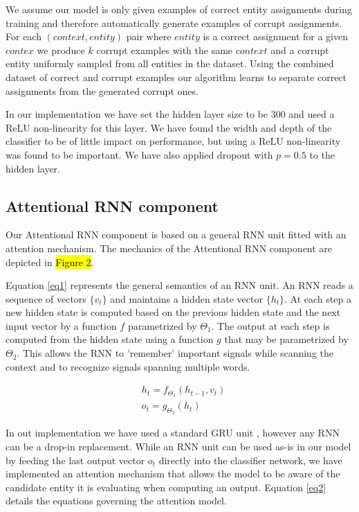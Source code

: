 \documentclass[11pt]{article}
\begin{document}
	We assume our model is only given examples of correct entity assignments during training and therefore automatically generate examples of corrupt assignments. For each $(context,entity)$ pair where $entity$ is a correct assignment for a given $contex$ we produce $k$ corrupt examples with the same $context$ and a corrupt entity uniformly sampled from all entities in the dataset. Using the combined dataset of correct and corrupt examples our algorithm learns to separate correct assignments from the generated corrupt ones.
	
	In our implementation we have set the hidden layer size to be 300 and used a ReLU non-linearity for this layer. We have found the width and depth of the classifier to be of little impact on performance, but using a ReLU non-linearity was found to be important. We have also applied dropout with $p=0.5$ to the hidden layer.
	
	\subsection{Attentional RNN component}

	Our Attentional RNN component is based on a general RNN unit fitted with an attention mechanism. The mechanics of the Attentional RNN component are depicted in \hl{Figure 2}. 
		
	Equation \ref{eq1} represents the general semantics of an RNN unit. An RNN reads a sequence of vectors $\{v_t\}$ and maintains a hidden state vector $\{h_t\}$. At each step a new hidden state is computed based on the previous hidden state and the next input vector by a function $f$ parametrized by $\Theta_1$. The output at each step is computed from the hidden state using a function $g$ that may be parametrized by $\Theta_2$. This allows the RNN to 'remember' important signals while scanning the context and to recognize signals spanning multiple words.
	
	\begin{equation}
	\label{eq1}
	\begin{aligned}
	& h_t=f_{\Theta_1}(h_{t-1}, v_t) \\
	& o_t=g_{\Theta_2}(h_t)
	\end{aligned}
	\end{equation}

	In out implementation we have used a standard GRU unit \cite{cho2014learning}, however any RNN can be a drop-in replacement. While an RNN unit can be used as-is in our model by feeding the last output vector $o_t$ directly into the classifier network, we have implemented an attention mechanism that allows the model to be aware of the candidate entity it is evaluating when computing an output. Equation \ref{eq2} details the equations governing the attention model.
	
\end{document}
